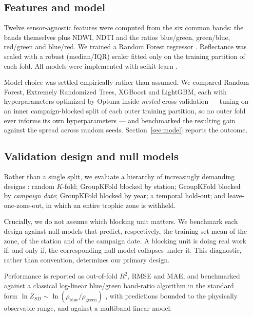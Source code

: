 \documentclass[preprint,review,12pt,authoryear]{elsarticle}
\begin{document}
\subsection{Features and model}

Twelve sensor-agnostic features were computed from the six common bands: the
bands themselves plus NDWI, NDTI and the ratios blue/green, green/blue,
red/green and blue/red. We trained a Random Forest regressor
\citep{Breiman2001}. Reflectance was scaled with a robust (median/IQR) scaler
fitted only on the training partition of each fold. All models were
implemented with scikit-learn \citep{Pedregosa2011}.

Model choice was settled empirically rather than assumed. We compared Random
Forest, Extremely Randomized Trees, XGBoost \citep{Chen2016} and LightGBM,
each with hyperparameters optimized by Optuna \citep{Akiba2019} inside
\emph{nested} cross-validation --- tuning on an inner campaign-blocked split
of each outer training partition, so no outer fold ever informs its own
hyperparameters --- and benchmarked the resulting gain against the spread
across random seeds. Section~\ref{sec:model} reports the outcome.

\subsection{Validation design and null models}\label{sec:valdesign}

Rather than a single split, we evaluate a hierarchy of increasingly demanding
designs \citep{Roberts2017}: random $K$-fold; GroupKFold blocked by station;
GroupKFold blocked by \emph{campaign date}; GroupKFold blocked by year; a
temporal hold-out; and leave-one-zone-out, in which an entire trophic zone is
withheld.

Crucially, we do not assume which blocking unit matters. We benchmark each
design against null models that predict, respectively, the training-set mean
of the zone, of the station and of the campaign date. A blocking unit is
doing real work if, and only if, the corresponding null model collapses under
it. This diagnostic, rather than convention, determines our primary design.

Performance is reported as out-of-fold $R^2$, RMSE and MAE, and benchmarked
against a classical log-linear blue/green band-ratio algorithm in the
standard form $\ln Z_{SD} \sim \ln(\rho_{\mathrm{blue}}/\rho_{\mathrm{green}})$
\citep{Kloiber2002}, with predictions bounded to the physically observable
range, and against a multiband linear model.
\end{document}
